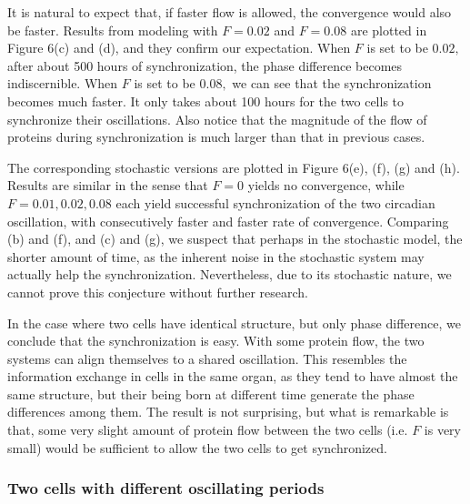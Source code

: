 \documentclass[12pt]{article}
\renewcommand{\(}{\left (}
\renewcommand{\)}{\right )}
\begin{document}
It is natural to expect that, if faster flow is allowed, the convergence would also be faster. Results from modeling with $F = 0.02$ and $F=0.08$ are plotted in Figure 6(c) and (d), and they confirm our expectation. When $F$ is set to be $0.02,$ after about 500 hours of synchronization, the phase difference becomes indiscernible. When $F$ is set to be $0.08,$ we can see that the synchronization becomes much faster. It only takes about 100 hours for the two cells to synchronize their oscillations. Also notice that the magnitude of the flow of proteins during synchronization is much larger than that in previous cases.

The corresponding stochastic versions are plotted in Figure 6(e), (f), (g) and (h). Results are similar in the sense that $F=0$ yields no convergence, while $F = 0.01, 0.02, 0.08$ each yield successful synchronization of the two circadian oscillation, with consecutively faster and faster rate of convergence. Comparing (b) and (f), and (c) and (g), we suspect that perhaps in the stochastic model, the shorter amount of time, as the inherent noise in the stochastic system may actually help the synchronization. Nevertheless, due to its stochastic nature, we cannot prove this conjecture without further research.

In the case where two cells have identical structure, but only phase difference, we conclude that the synchronization is easy. With some protein flow, the two systems can align themselves to a shared oscillation. This resembles the information exchange in cells in the same organ, as they tend to have almost the same structure, but their being born at different time generate the phase differences among them. The result is not surprising, but what is remarkable is that, some very slight amount of protein flow between the two cells (i.e. $F$ is very small) would be sufficient to allow the two cells to get synchronized.

\subsubsection{Two cells with different oscillating periods}
\end{document}
